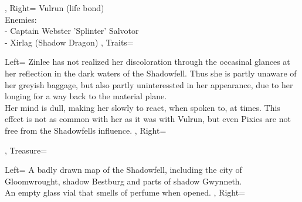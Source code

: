 \documentclass[10pt,a4paper]{scrbook}
\begin{document}
{{{			},
			Right={
				Vulrun (life bond)\\
				Enemies:\\
				- Captain Webster 'Splinter' Salvotor\\
				- Xirlag (Shadow Dragon)
			}
		},
		Traits={
			Left={
				Zinlee has not realized her discoloration through the occasinal glances at her reflection in the dark waters of the Shadowfell. Thus she is partly unaware of her greyish baggage, but also partly uninteressted in her appearance, due to her longing for a way back to the material plane.\\
				Her mind is dull, making her slowly to react, when spoken to, at times. This effect is not as common with her as it was with Vulrun, but even Pixies are not free from the Shadowfells influence.
			},
			Right={
				
			}
		},
		Treasure={
			Left={
				A badly drawn map of the Shadowfell, including the city of Gloomwrought, shadow Bestburg and parts of shadow Gwynneth.\\
				An empty glass vial that smells of perfume when opened.
			},
			Right={
				
			}
		}
	}

\end{document}
